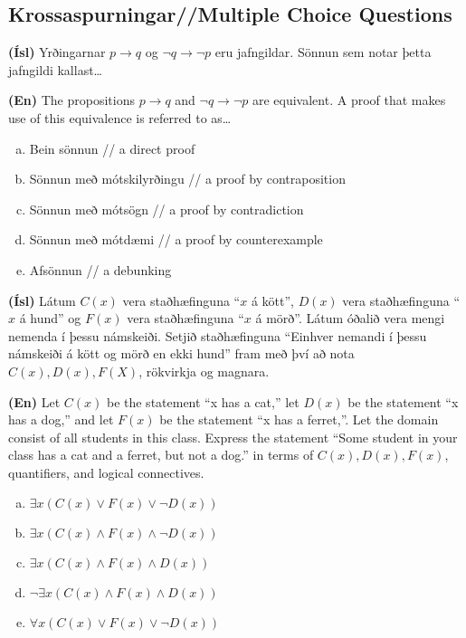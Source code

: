 \documentclass[addpoints]{exam}
\begin{document}
\begin{questions}
        
\section{Krossaspurningar//Multiple Choice Questions}

\question[3] 

\textbf{(Ísl)} Yrðingarnar $p \to q$ og $\lnot q \to \lnot p$ eru jafngildar. Sönnun sem notar þetta jafngildi kallast\ldots

\textbf{(En)} The propositions $p \to q$ and $\lnot q \to \lnot p$ are equivalent. A proof that makes use of this equivalence is referred to as\ldots

\begin{enumerate}[a)]
    \item Bein sönnun // a direct proof
    \item Sönnun með mótskilyrðingu // a proof by contraposition
    \item Sönnun með mótsögn // a proof by contradiction
    \item Sönnun með mótdæmi // a proof by counterexample
    \item Afsönnun // a debunking
\end{enumerate}

\question[3]
\textbf{(Ísl)} Látum $C(x)$ vera staðhæfinguna ``$x$ á kött'', $D(x)$ vera staðhæfinguna ``$x$ á hund'' og $F(x)$ vera staðhæfinguna ``$x$ á mörð''. Látum óðalið vera mengi nemenda í þessu námskeiði. Setjið staðhæfinguna ``Einhver nemandi í þessu námskeiði á kött og mörð en ekki hund'' fram með því að nota $C(x), D(x), F(X)$, rökvirkja og magnara.
    
\textbf{(En)} Let $C(x)$ be the statement ``x has a cat,'' let $D(x)$ be the statement ``x has a dog,'' and let $F(x)$ be the statement ``x has a ferret,''. Let the domain consist of all students in this class. Express the statement ``Some student in your class has a cat and a ferret, but not a dog.'' in terms of $C(x), D(x), F(x)$, quantifiers, and logical connectives.

\begin{enumerate}[a)]
    \item $\exists x(C(x) \lor F(x) \lor \lnot D(x))$
    \item $\exists x(C(x) \land F(x) \land \lnot D(x))$ %
    \item $\exists x(C(x) \land F(x) \land D(x))$
    \item $\lnot \exists x(C(x) \land F(x) \land D(x))$
    \item $\forall x(C(x) \lor F(x) \lor \lnot D(x))$
\end{enumerate}


\end{questions}
\end{document}
